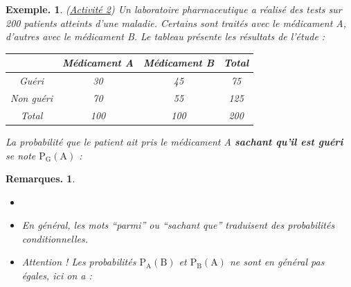\documentclass[12pt]{article}
\theoremstyle{break}
\newtheorem*{example}{Exemple.}
\newtheorem*{remarks}{Remarques.}
\begin{document}
\begin{example}(\underline{Activité 2})
  Un laboratoire pharmaceutique a réalisé des tests sur 200 patients atteints d'une maladie.
  Certains sont traités avec le médicament A, d'autres avec le médicament B.
  Le tableau présente les résultats de l'étude :
  \begin{center}
    \begin{tabular}{|c|c|c|c|}
    \hline
    & Médicament A & Médicament B & Total \\
    \hline
    Guéri & 30 & 45 & 75 \\
    \hline
    Non guéri & 70 & 55 & 125 \\
    \hline
    Total & 100 & 100 & 200 \\
    \hline
    \end{tabular}
  \end{center}

  La probabilité que le patient ait pris le médicament A \textbf{sachant qu'il est guéri}
  se note $\mathrm{P}_\mathrm{G}(\mathrm{A})$ :

  \vspace{0.2em}
\end{example}

\begin{remarks}
\begin{itemize}
  \item[]
  \item En général, les mots ``parmi'' ou ``sachant que'' traduisent des probabilités conditionnelles.
  \item Attention ! Les probabilités $\mathrm{P}_{\mathrm{A}}(\mathrm{B})$ et $\mathrm{P}_{\mathrm{B}}(\mathrm{A})$ ne sont en général pas égales, ici on a :
  
  \vspace{0.2em}
\end{itemize}
\end{remarks}
\end{document}
